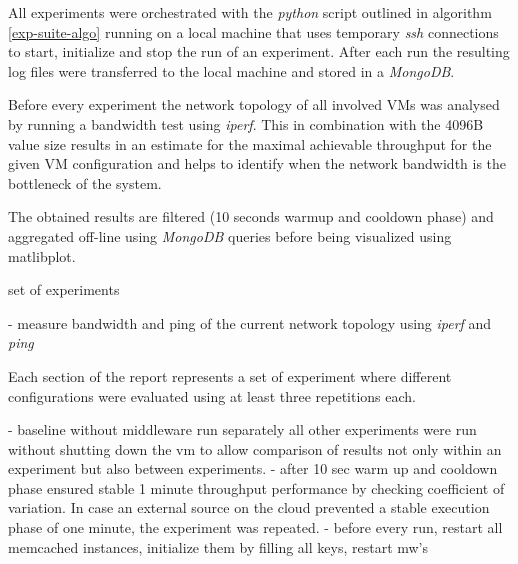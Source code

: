 \documentclass[report.tex]{subfiles}
\begin{document}
All experiments were orchestrated with the \emph{python} script outlined in algorithm \ref{exp-suite-algo} running on a local machine that uses temporary \emph{ssh} connections to start, initialize and stop the run of an experiment. After each run  the resulting log files were transferred to the local machine and stored in a \emph{MongoDB}.
 
Before every experiment the network topology of all involved VMs was analysed by running a bandwidth test using \emph{iperf}. This in combination with the 4096B value size results in an estimate for the maximal achievable throughput for the given VM configuration and helps to identify when the network bandwidth is the bottleneck of the system.

The obtained results are filtered (10 seconds warmup and cooldown phase) and aggregated off-line using \emph{MongoDB} queries before being visualized using matlibplot.

\begin{algorithm}
	\ForEach
	{
		set of experiments
	}{
		- measure bandwidth and ping of the current network topology using \emph{iperf} and \emph{ping}
		
	}
	\caption{Each section of the report represents a set of experiment where different configurations were evaluated using at least three repetitions each.}\label{exp-suite-algo}
\end{algorithm}


- baseline without middleware run separately all other experiments were run without shutting down the vm to allow comparison of results not only within an experiment but also between experiments.
- after 10 sec warm up and cooldown phase ensured stable 1 minute throughput performance by checking coefficient of variation. In case an external source on the cloud prevented a stable execution phase of one minute, the experiment was repeated.
- before every run, restart all memcached instances, initialize them by filling all keys, restart mw's
\end{document}
